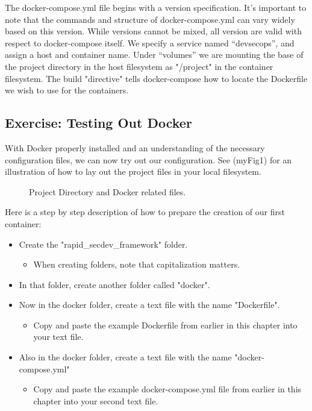 \justify
The docker-compose.yml file begins with a version specification. It's
important to note that the commands and structure of docker-compose.yml
can vary widely based on this version. While versions cannot be mixed,
all version are valid with respect to docker-compose itself. We specify
a service named ``devsecops'', and assign a host and container name. Under
``volumes'' we are mounting the base of the project directory in the host
filesystem as "/project" in the container filesystem. The build
"directive" tells docker-compose how to locate the Dockerfile we wish to
use for the containers.

\subsection{Exercise: Testing Out Docker}
\justify{}
With Docker properly installed and an understanding of the necessary
configuration files, we can now try out our configuration. See
({myFig1}) for an illustration of how to lay out the project files in your local filesystem.

\begin{figure}[!htb]
  \centering
  
  \caption{Project Directory and Docker related files.}
\end{figure}

\clearpage
\justify{}
Here is a step by step description of how to prepare the creation of our first container:

\begin{itemize}
  \item Create the "rapid\_secdev\_framework" folder.
        \begin{itemize}
          \item When creating folders, note that capitalization matters.
        \end{itemize}
  \item In that folder, create another folder called "docker".
  \item Now in the docker folder, create a text file with the name "Dockerfile".
        \begin{itemize}
          \item
                Copy and paste the example Dockerfile from earlier in this chapter
                into your text file.
        \end{itemize}
  \item Also in the docker folder, create a text file with the name "docker-compose.yml"
        \begin{itemize}
          \item Copy and paste the example docker-compose.yml file from earlier in this chapter into your second text file.
        \end{itemize}
\end{itemize}

